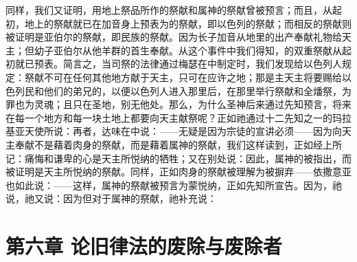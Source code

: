 同样，我们又证明，用地上祭品所作的祭献和属神的祭献曾被预言；而且，从起初，地上的祭献就已在加音身上预表为的祭献，即以色列的祭献；而相反的祭献则被证明是亚伯尔的祭献，即民族的祭献。因为长子加音从地里的出产奉献礼物给天主；但幼子亚伯尔从他羊群的首生奉献。从这个事件中我们得知，的双重祭献从起初就已预表。简言之，当司祭的法律通过梅瑟在中制定时，我们发现给以色列人规定：祭献不可在任何其他地方献于天主，只可在应许之地；那是主天主将要赐给以色列民和他们的弟兄的，以便以色列人进入那里后，在那里举行祭献和全燔祭，为罪也为灵魂；且只在圣地，别无他处。那么，为什么圣神后来通过先知预言，将来在每一个地方和每一块土地上都要向天主献祭呢？正如祂通过十二先知之一的玛拉基亚天使所说：再者，达味在中说：——无疑是因为宗徒的宣讲必须——因为向天主奉献不是藉着肉身的祭献，而是藉着属神的祭献，我们这样读到，正如经上所记：痛悔和谦卑的心是天主所悦纳的牺牲；又在别处说：因此，属神的被指出，而被证明是天主所悦纳的祭献。同样，正如肉身的祭献被理解为被摒弃——依撒意亚也如此说：——这样，属神的祭献被预言为蒙悦纳，正如先知所宣告。因为，祂说，祂又说：因为但对于属神的祭献，祂补充说：\par


\section{第六章 论旧律法的废除与废除者}

